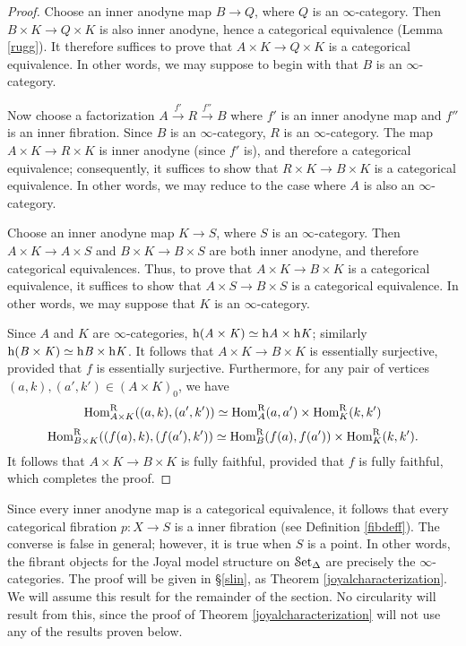 \begin{proof}
Choose an inner anodyne map $B \rightarrow Q$, where $Q$ is an $\infty$-category. Then $B \times K \rightarrow Q \times K$ is also inner anodyne, hence a categorical equivalence (Lemma \ref{rugg}). 
It therefore suffices to prove that $A \times K \rightarrow Q \times K$ is a categorical equivalence. In other words, we may suppose to begin with that $B$ is an $\infty$-category.

Now choose a factorization $A \stackrel{f'}{\rightarrow} R \stackrel{f''}{\rightarrow} B$ where $f'$ is an inner anodyne map and $f''$ is an inner fibration. Since $B$ is an $\infty$-category, $R$ is an $\infty$-category.
The map $A \times K \rightarrow R \times K$ is inner anodyne (since $f'$ is), and therefore a categorical equivalence; consequently, it suffices to show that $R \times K \rightarrow B \times K$ is a categorical equivalence. In other words, we may reduce to the case where $A$ is also an $\infty$-category.

Choose an inner anodyne map $K \rightarrow S$, where $S$ is an $\infty$-category. Then $A \times K \rightarrow A \times S$ and $B \times K \rightarrow B \times S$ are both inner anodyne, and therefore categorical equivalences. Thus, to prove that $A \times K \rightarrow B \times K$ is a categorical equivalence, it suffices to show that $A \times S \rightarrow B \times S$ is a categorical equivalence. In other words, we may suppose that $K$ is an $\infty$-category.

Since $A$ and $K$ are $\infty$-categories, $\rm{h} \it{(A \times K)} \simeq \rm{h} \it{A} \times \rm{h} \it{K}$; similarly
$\rm{h} \it{(B \times K)} \simeq \rm{h} \it{B} \times \rm{h} \it{K}$. It follows that $A \times K \rightarrow B \times K$ is essentially surjective, provided that $f$ is essentially surjective. Furthermore, for any pair of vertices $(a,k), (a',k') \in (A \times K)_0$, we have 
$$\operatorname{Hom}^{\operatorname{R}}_{A \times K}( (a,k), (a',k') ) \simeq \operatorname{Hom}^{\operatorname{R}}_{A}(a,a') \times \operatorname{Hom}^{\operatorname{R}}_K(k,k')$$
$$\operatorname{Hom}^{\operatorname{R}}_{B \times K}( (f(a),k), (f(a'),k')) \simeq \operatorname{Hom}^{\operatorname{R}}_{B}(f(a),f(a')) \times \operatorname{Hom}^{\operatorname{R}}_K(k,k').$$
It follows that $A \times K \rightarrow B \times K$ is fully faithful, provided that $f$ is fully faithful, which completes the proof.
\end{proof}

\begin{remark}\label{tokenn}
Since every inner anodyne map is a categorical equivalence, it follows that every categorical fibration $p: X \rightarrow S$ is a inner fibration (see Definition \ref{fibdeff}). The converse is false in general; however, it is true when $S$ is a point. In other words, the fibrant objects for the Joyal model structure on $\operatorname{\mathcal{S}et_{\Delta}}$ are precisely the $\infty$-categories. The proof will be given in \S \ref{slin}, as Theorem \ref{joyalcharacterization}. We will assume this result for the remainder of the section. No circularity will result from this, since the proof of Theorem \ref{joyalcharacterization} will not use any of the results proven below.
\end{remark}

